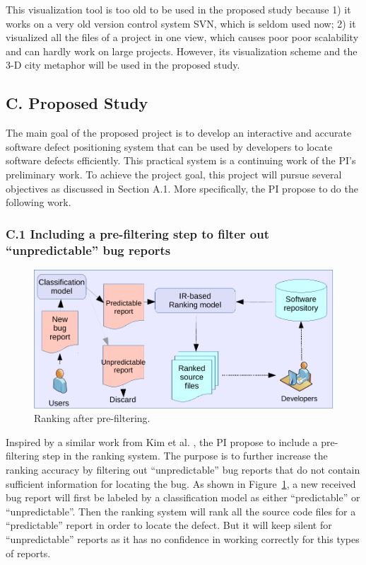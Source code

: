 This visualization tool is too old to be used in the proposed study because 1) it works on a very old version control system SVN, which is seldom used now; 2) it visualized all the files of a project in one view, which causes poor poor scalability and can hardly work on large projects. However, its visualization scheme and the 3-D city metaphor will be used in the proposed study.

\subsection{C. Proposed Study}
The main goal of the proposed project is to develop an interactive and accurate software defect positioning system that can be used by developers to locate software defects efficiently. This practical system is a continuing work of the PI's preliminary work. To achieve the project goal, this project will pursue several objectives as discussed in Section A.1. More specifically, the PI propose to do the following work.

\subsubsection{C.1 Including a pre-filtering step to filter out ``unpredictable'' bug reports}
\begin{figure}[!h]
\centering
\includegraphics[width=\columnwidth]{figures/prefiltering.pdf}
\caption{Ranking after pre-filtering.}
\label{fig:prefiltering}
\end{figure}
Inspired by a similar work from Kim et al. \cite{Kim:2013:WFT:2554428.2554437}, the PI propose to include a pre-filtering step in the ranking system. The purpose is to further increase the ranking accuracy by filtering out ``unpredictable'' bug reports that do not contain sufficient information for locating the bug. As shown in Figure~\ref{fig:prefiltering}, a new received bug report will first be labeled by a classification model as either ``predictable'' or ``unpredictable''. Then the ranking system will rank all the source code files for a ``predictable'' report in order to locate the defect. But it will keep silent for ``unpredictable'' reports as it has no confidence in working correctly for this types of reports.

